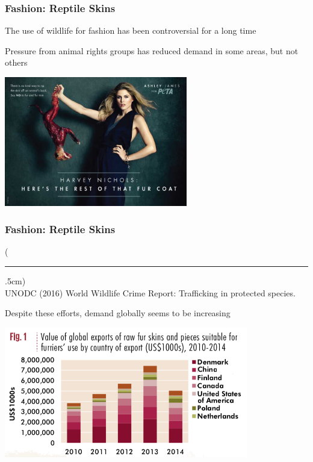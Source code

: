 \documentclass[10pt]{beamer}
\newenvironment{reference}[2]{%
	\begin{textblock*}{\textwidth}(#1,#2)
		\tiny\bgroup\color{gray}}{\egroup\end{textblock*}}
\begin{document}
\begin{frame}[t]
\frametitle{Fashion: Reptile Skins}
\vspace{0.5cm}

	The use of wildlife for fashion has been controversial for a long time\\
	
	\vspace{0.4cm}
	
	Pressure from animal rights groups has reduced demand in some areas, but not others\\
	
	\vspace{0.25cm}
	
	\begin{center}
		\includegraphics[width=0.6\textwidth]{figures/peta.jpg}
	\end{center}	
\end{frame}


\begin{frame}[t]
\frametitle{Fashion: Reptile Skins}
\vspace{0.5cm}

	\begin{reference}{4mm}{92mm}
		\rule{1.5cm}{0.25pt}\\
		UNODC (2016) World Wildlife Crime Report: Trafficking in protected species.
	\end{reference}
	
	Despite these efforts, demand globally seems to be increasing
	
	\vspace{0.5cm}
	
	\begin{center}
		\includegraphics[width=0.8\textwidth]{figures/fashion_trends.png}
	\end{center}	
\end{frame}
\end{document}
